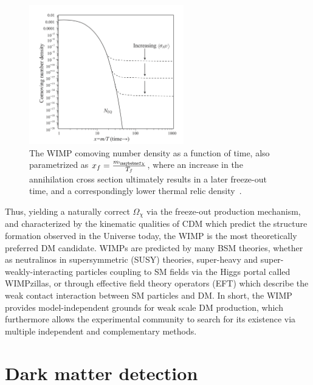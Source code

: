 \begin{figure}
  \centering
  \includegraphics[width=0.6\textwidth]{figs/WIMP_thermal_relic}
  \caption{The WIMP comoving number density as a function of time, also parametrized as $x_f = \frac{\mDM}{T_f}$, where an increase in the annihilation cross section ultimately results in a later freeze-out time, and a correspondingly lower thermal relic density~\cite{Kolb:1990vq}.}
  \label{fig:WIMPrelic}
\end{figure}

Thus, yielding a naturally correct $\Omega_\chi$ via the freeze-out production mechanism, and characterized by the kinematic qualities of CDM which predict the structure formation observed in the Universe today, the WIMP is the most theoretically preferred DM candidate. WIMPs are predicted by many BSM theories, whether as neutralinos in supersymmetric (SUSY) theories, super-heavy and super-weakly-interacting particles coupling to SM fields via the Higgs portal called WIMPzillas, or through effective field theory operators (EFT) which describe the weak contact interaction between SM particles and DM. In short, the WIMP provides model-independent grounds for weak scale DM production, which furthermore allows the experimental community to search for its existence via multiple independent and complementary methods.

\section{Dark matter detection}
\label{sec:DMsearches}

